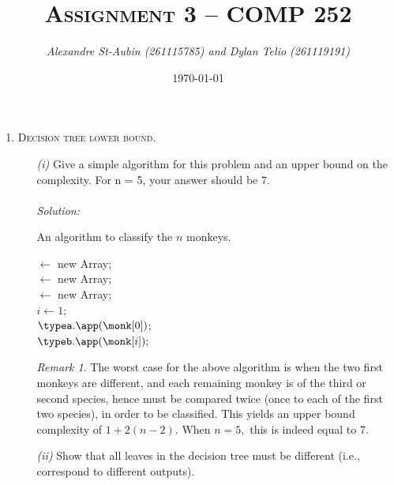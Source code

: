 \documentclass[12pt]{article}
\title{\textsc{Assignment 3 -- COMP 252}}
\author{\it Alexandre St-Aubin (261115785) and Dylan Telio (261119191)}
\date{\today}
\theoremstyle{definition}
\theoremstyle{remark}
\newtheorem*{remark}{Remark}
\newcommand\sol{%
  \\ 
  \\
  \textit{Solution:}\\%
}
\begin{document}
\maketitle 
\begin{enumerate}
  \item \textsc{Decision tree lower bound.}
  \begin{enumerate}
    \item[\it (i)]Give a simple algorithm for this problem and an upper bound on the complexity. For n = 5, your answer should be 7.
    \sol
    \begin{algorithm}
    \caption{An algorithm to classify the $n$ monkeys. }
    \BlankLine
    \typea $\leftarrow$ new Array;  \\ 
    \typeb $\leftarrow$ new Array;  \\ 
    \typec $\leftarrow$ new Array;  \\ 
    $i \leftarrow 1;$\\ 
    $\typea.\app(\monk[0])$;\\
      $\typeb.\app (\monk[i]);$
    \BlankLine 
  \end{algorithm}
    \begin{remark} 
      The worst case for the above algorithm is when the two first monkeys are different, and each remaining monkey is of the third or second species, hence must be compared twice (once to each of the first two species), in order to be classified. This yields an upper bound complexity of $1 + 2(n-2).$ When $n = 5, $ this is indeed equal to 7.
    \end{remark} 
    \newpage
    \item[\it (ii)] Show that all leaves in the decision tree must be different (i.e., correspond to different outputs).

\end{enumerate}
\end{enumerate}
\end{document}
